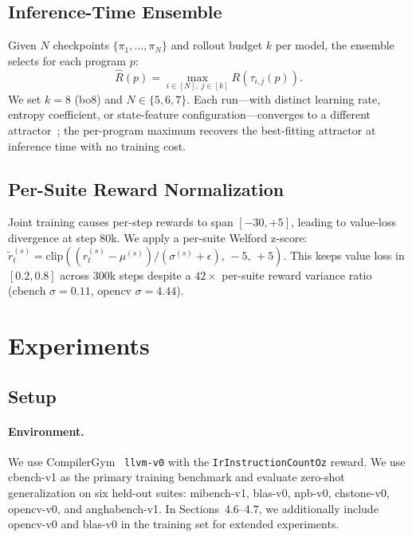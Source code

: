 \documentclass{article}
\begin{document}
\subsection{Inference-Time Ensemble}

Given $N$ checkpoints $\{\pi_1,\ldots,\pi_N\}$ and rollout budget $k$ per
model, the ensemble selects for each program $p$:
\begin{equation}
  \hat{R}(p) = \max_{i \in [N],\; j \in [k]}
               R\!\left(\tau_{i,j}(p)\right).
\end{equation}
We set $k{=}8$ (bo8) and $N \in \{5,6,7\}$.  Each run---with distinct
learning rate, entropy coefficient, or state-feature configuration---converges
to a different attractor~\cite{lakshminarayanan2017simple, osband2016deep};
the per-program maximum recovers the best-fitting attractor at inference time
with no training cost.

\subsection{Per-Suite Reward Normalization}

Joint training causes per-step rewards to span $[-30,+5]$, leading to
value-loss divergence at step 80k.  We apply a per-suite Welford z-score:
$\tilde{r}_t^{(s)} = \mathrm{clip}((r_t^{(s)}{-}\mu^{(s)})/(\sigma^{(s)}{+}\epsilon),\,-5,\,+5)$.
This keeps value loss in $[0.2, 0.8]$ across 300k steps despite a
$42\times$ per-suite reward variance ratio (cbench $\sigma{=}0.11$,
opencv $\sigma{=}4.44$).


\section{Experiments}

\subsection{Setup}

\paragraph{Environment.}
We use CompilerGym~\cite{CompilerGym} \texttt{llvm-v0} with the \texttt{IrInstructionCountOz} reward. We use cbench-v1 as the primary training benchmark and evaluate zero-shot generalization on six held-out suites: mibench-v1, blas-v0, npb-v0, chstone-v0, opencv-v0, and anghabench-v1. In Sections~4.6--4.7, we additionally include opencv-v0 and blas-v0 in the training set for extended experiments.
\end{document}
